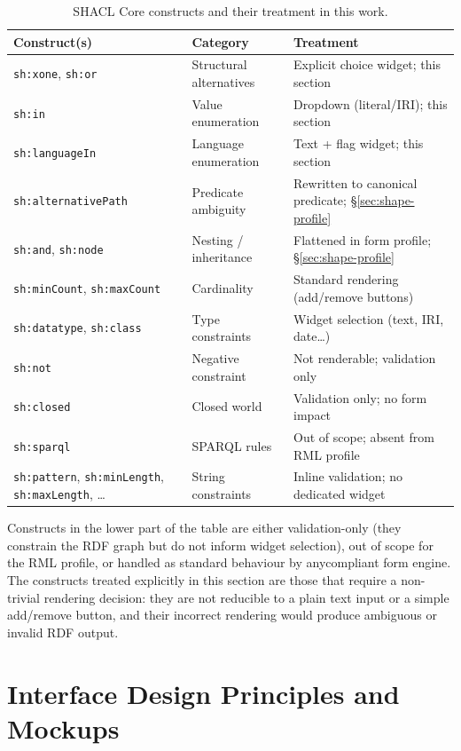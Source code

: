 \begin{table}[h]
\centering
\small
\caption{SHACL Core constructs and their treatment in this work.}
\label{tab:shacl-classification}
\begin{tabular}{p{4.2cm} p{3.5cm} p{5.5cm}}
\toprule
\textbf{Construct(s)} & \textbf{Category} & \textbf{Treatment} \\
\midrule
\texttt{sh:xone}, \texttt{sh:or}
  & Structural alternatives
  & Explicit choice widget; this section \\
\texttt{sh:in}
  & Value enumeration
  & Dropdown (literal/IRI); this section \\
\texttt{sh:languageIn}
  & Language enumeration
  & Text + flag widget; this section \\
\texttt{sh:alternativePath}
  & Predicate ambiguity
  & Rewritten to canonical predicate; \S\ref{sec:shape-profile} \\
\texttt{sh:and}, \texttt{sh:node}
  & Nesting / inheritance
  & Flattened in form profile; \S\ref{sec:shape-profile} \\
\texttt{sh:minCount}, \texttt{sh:maxCount}
  & Cardinality
  & Standard rendering (add/remove buttons) \\
\texttt{sh:datatype}, \texttt{sh:class}
  & Type constraints
  & Widget selection (text, IRI, date\ldots) \\
\texttt{sh:not}
  & Negative constraint
  & Not renderable; validation only \\
\texttt{sh:closed}
  & Closed world
  & Validation only; no form impact \\
\texttt{sh:sparql}
  & SPARQL rules
  & Out of scope; absent from RML profile \\
\texttt{sh:pattern}, \texttt{sh:minLength}, \texttt{sh:maxLength}, \ldots
  & String constraints
  & Inline validation; no dedicated widget \\
\bottomrule
\end{tabular}
\end{table}

Constructs in the lower part of the table are either validation-only (they constrain the RDF graph but do not inform widget selection), out of scope for the RML profile, or handled as standard behaviour by anycompliant form engine.
The constructs treated explicitly in this section are those that require a non-trivial rendering decision: they are not reducible to a plain text input or a simple add/remove button, and their incorrect rendering would produce ambiguous or invalid RDF output.

\section{Interface Design Principles and Mockups}
